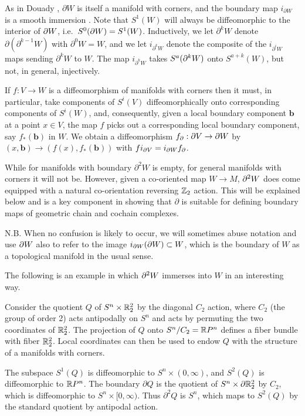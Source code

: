 As in Douady \cite{Doua61}, $\partial W$ is itself a manifold with corners, and the boundary map $i_{\partial W}$ is a smooth immersion \cite[Theorem 3.4]{Joy12}. Note that $S^1(W)$ will always be diffeomorphic to the interior of $\partial W$, i.e.\ $S^0(\partial W)=S^1(W)$. 
Inductively, we let $\partial^k W$ denote $\partial (\partial^{k-1} W)$ with $\partial^0 W = W$, and we let $i_{\partial^k W}$ denote the composite of the $i_{\partial^i W}$ maps sending $\partial^k W$ to $W$. The map $i_{\partial^k W}$ takes $S^a(\partial^k W)$ onto $S^{a+k}(W)$, but not, in general, injectively. 

\begin{remark}\label{R: bd diff}
If $f:V\to W$ is a diffeomorphism of manifolds with corners then it must, in particular, take components of $S^i(V)$ diffeomorphically onto corresponding components of $S^i(W)$, and, consequently, given a local boundary component $\mathbf{b}$ at a point $x\in V$, the map $f$ picks out a corresponding local boundary component, say $f_*(\mathbf{b})$ in $W$. We obtain a diffeomorphism $f_\partial:\partial V\to \partial W$ by $(x,\mathbf{b})\to (f(x),f_*(\mathbf{b}))$ with $fi_{\partial V}= i_{\partial W} f_\partial$.
\end{remark}

While for manifolds with boundary $\partial^2W$ is empty, for general manifolds with corners it will not be. However, given a co-oriented map $W\to M$,  $\partial^2W$ does come equipped with a natural co-orientation reversing $\mathbb{Z}_2$ action. This will be explained below and is a key component in showing that $\partial$ is suitable for defining boundary maps of geometric chain and cochain complexes. 

N.B. When no confusion is likely to occur, we will sometimes abuse notation and use $\partial W$ also to refer to the image $i_{\partial W}(\partial W)\subset W$, which is the boundary of $W$ as a topological manifold in the usual sense.


The following is an example in which $\partial^2 W$ immerses into $W$ in an interesting way.

\begin{example} \label{boundary}
Consider the quotient $Q$ of $S^n \times \mathbb{R}^2_2$ by the diagonal $C_2$ action, where $C_2$ (the group of order 2) acts antipodally on $S^n$ and acts by permuting the two coordinates
of $\mathbb{R}^2_2$.
The projection of $Q$ onto $S^n / C_2 = \mathbb{R} P^n$ defines a fiber bundle with fiber $\mathbb{R}^2_2$.
Local coordinates can then be used to endow $Q$ with the structure of a  manifolds with corners.  

The subspace $S^1(Q)$ is diffeomorphic to $S^n \times (0,\infty)$, and $S^2(Q)$ is diffeomorphic to $\mathbb{R} P^n$.
The boundary $\partial Q$ is the quotient of $S^n \times \partial \mathbb{R}^2_2$ by $C_2$, which is diffeomorphic to 
$S^n \times [0,\infty)$.
Thus $\partial^2 Q$ is $S^n$, which maps to $S^2(Q)$ by the standard quotient by antipodal action.
\end{example}
    
